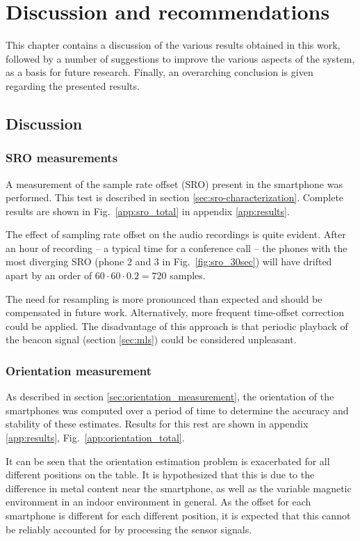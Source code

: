 \documentclass[a4paper, notitlepage]{report}
\begin{document}
\chapter{Discussion and recommendations}
\label{ch:conclusion}
This chapter contains a discussion of the various results obtained in this work, followed by a number of suggestions to improve the various aspects of the system, as a basis for future research. Finally, an overarching conclusion is given regarding the presented results.

\section{Discussion}
\subsection{SRO measurements}
\label{sec:disc_sro}
A measurement of the sample rate offset (SRO) present in the smartphone was performed. This test is described in section \ref{sec:sro-characterization}. Complete results are shown in Fig.~\ref{app:sro_total} in appendix \ref{app:results}.

The effect of sampling rate offset on the audio recordings is quite evident. After an hour of recording -- a typical time for a conference call -- the phones with the most diverging SRO (phone 2 and 3 in Fig.~\ref{fig:sro_30sec}) will have drifted apart by an order of $60\cdot60\cdot0.2=720$ samples.

The need for resampling is more pronounced than expected and should be compensated in future work. Alternatively, more frequent time-offset correction could be applied. The disadvantage of this approach is that periodic playback of the beacon signal (section \ref{sec:mls}) could be considered unpleasant.

\subsection{Orientation measurement}
\label{sec:disc_orient}
As described in section \ref{sec:orientation_measurement}, the orientation of the smartphones was computed over a period of time to determine the accuracy and stability of these estimates. Results for this rest are shown in appendix \ref{app:results}, Fig.~\ref{app:orientation_total}.

It can be seen that the orientation estimation problem is exacerbated for all different positions on the table. It is hypothesized that this is due to the difference in metal content near the smartphone, as well as the variable magnetic environment in an indoor environment in general. As the offset for each smartphone is different for each different position, it is expected that this cannot be reliably accounted for by processing the sensor signals.
\end{document}
